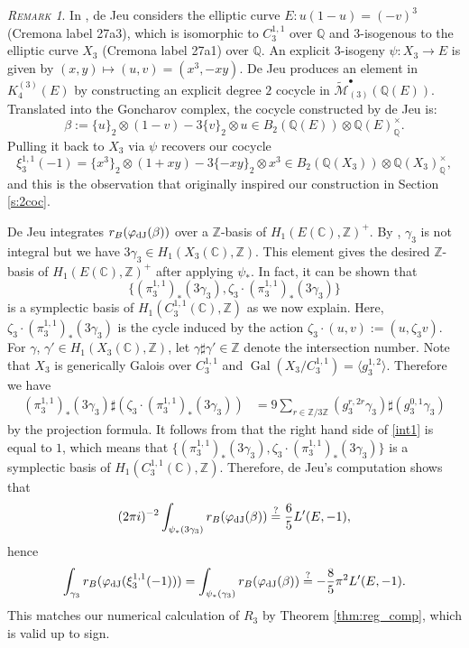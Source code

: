 \documentclass[11pt,a4,leqno]{amsart}
\theoremstyle{my theoremstyle}
\theoremstyle{dfn}
\theoremstyle{remark}
\newtheorem{rmk}[thm]{{\scshape Remark}}
\renewcommand{\1}{\mathbbm{1}}
\newcommand{\Z}{\mathbb{Z}}
\newcommand{\Q}{\mathbb{Q}}
\newcommand{\C}{\mathbb{C}}
\numberwithin{equation}{section}
\begin{document}
\begin{rmk}\label{rmk:jeuX3}
    In \cite[p.~19]{JeuSlides}, de Jeu considers the elliptic curve $E \colon u(1-u)=(-v)^3$ (Cremona label 27a3), which is isomorphic to $C^{1,1}_3$ over $\Q$ and $3$-isogenous to the elliptic curve $X_3$ (Cremona label 27a1) over $\Q$. An explicit $3$-isogeny $\psi \colon X_3 \to E$ is given by $(x,y)\mapsto (u,v)=(x^3, -xy)$. De Jeu produces an element in $K_4^{(3)}(E)$ by constructing an explicit degree $2$ cocycle in $\widetilde{\mathcal{M}}_{(3)}^{\bullet}(\Q(E))$. Translated into the Goncharov complex, the cocycle constructed by de Jeu is:
\[
\beta:=\{ u \}_2 \otimes (1-v)-3\{ v \}_2 \otimes u\in B_2(\Q(E))\otimes \Q(E)^\times_{\Q}.
\]
Pulling it back to $X_3$ via $\psi$ recovers our cocycle
\[
\xi_3^{1,1}(-1)=\{ x^3 \}_2 \otimes (1+xy)-3\{ -xy \}_2 \otimes x^3 \in B_2(\Q(X_3))\otimes \Q(X_3)^\times_{\Q},
\]
and this is the observation that originally inspired our construction in Section \ref{s:2coc}.

De Jeu integrates $r_B(\varphi_{\rm dJ}(\beta))$ over a $\Z$-basis of $H_1({E(\C), \Z})^+$. 
By \cite[Corollary 2.3]{Ots}, $\gamma_3$ is not integral but we have
$3 \gamma_3 \in H_1(X_3(\C), \Z)$. This element gives the desired $\Z$-basis of $H_1({E(\C), \Z})^+$ after applying $\psi_*$. In fact, it can be shown that $$\{(\pi_3^{1,1})_* (3\gamma_3), \zeta_3\cdot (\pi_3^{1,1})_*(3\gamma_3)\}$$ is a symplectic basis of $H_1(C_3^{1,1}(\C), \Z)$ as we now explain. Here, $\zeta_3\cdot (\pi_3^{1,1})_*(3\gamma_3)$ is the cycle induced by the action $\zeta_3 \cdot (u, v):=(u, \zeta_3 v)$.  
For $\gamma$, $\gamma' \in H_1(X_3(\C), \Z)$, let $\gamma \sharp \gamma' \in \Z$ denote the intersection number.  
Note that $X_3$ is generically Galois over $C_3^{1,1}$ and $\operatorname{Gal}(X_3/C_3^{1,1}) =\langle g_3^{1, 2}\rangle$. 
Therefore we have 
\begin{align} \label{int1}
(\pi_3^{1,1})_*(3\gamma_3) \sharp (\zeta_3 \cdot (\pi_3^{1,1})_*(3\gamma_3) )&= 9\sum_{r \in \Z/3\Z}(g_3^{r, 2r} \gamma_3) \sharp (g_3^{0, 1} \gamma_3) 
\end{align}
by the projection formula. 
It follows from \cite[Corollary 3.4]{Ots} that the right hand side of \eqref{int1} is equal to $1$, 
which means that 
$\{(\pi_3^{1,1})_* (3\gamma_3), \zeta_3\cdot (\pi_3^{1,1})_*(3\gamma_3)\}$ is a symplectic basis of $H_1(C_3^{1,1}(\C), \Z)$. 
Therefore, de Jeu's computation shows that
$$(2\pi i)^{-2} \int_{\psi_*(3 \gamma_3)} r_B(\varphi_{\rm dJ}(\beta))\overset{?}{=} \frac{6}5 L'(E, -1), $$
hence 
$$\int_{\gamma_3} r_B(\varphi_{\rm dJ}(\xi_3^{1,1}(-1)))=\int_{\psi_*(\gamma_3)} r_B(\varphi_{\rm dJ}(\beta))\overset{?}{=}-\frac{8}5 \pi^2 L'(E, -1). $$
This matches our numerical calculation of $R_3$ by Theorem \ref{thm:reg_comp}, which is valid up to sign.   
\end{rmk}
\end{document}
